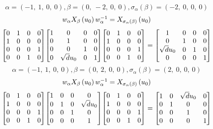 \documentclass[11pt]{article}
\theoremstyle{definition}
\begin{document}
\[
\alpha = \left( -1, \  1, \  0, \  0\right), \beta = \left( 0, \  -2, \  0, \  0\right), \sigma_{\alpha}(\beta) = \left( -2, \  0, \  0, \  0\right)
\]
\[
\scaletoalign{\textwidth}{w_{\alpha} X_{\beta}\left(u_{0}\right) w_{\alpha}^{-1} = X_{\sigma_{\alpha}\left(\beta\right)}\left(u_{0}\right)}
\]
\[
\scaletoalign{\textwidth}{{\left[\begin{matrix}0 & 1 & 0 & 0\\1 & 0 & 0 & 0\\0 & 0 & 0 & 1\\0 & 0 & 1 & 0\end{matrix}\right]} {\left[\begin{matrix}1 & 0 & 0 & 0\\0 & 1 & 0 & 0\\0 & 0 & 1 & 0\\0 & \sqrt{d} u_{0} & 0 & 1\end{matrix}\right]} {\left[\begin{matrix}0 & 1 & 0 & 0\\1 & 0 & 0 & 0\\0 & 0 & 0 & 1\\0 & 0 & 1 & 0\end{matrix}\right]} = {\left[\begin{matrix}1 & 0 & 0 & 0\\0 & 1 & 0 & 0\\\sqrt{d} u_{0} & 0 & 1 & 0\\0 & 0 & 0 & 1\end{matrix}\right]}}
\]
\[
\alpha = \left( -1, \  1, \  0, \  0\right), \beta = \left( 0, \  2, \  0, \  0\right), \sigma_{\alpha}(\beta) = \left( 2, \  0, \  0, \  0\right)
\]
\[
\scaletoalign{\textwidth}{w_{\alpha} X_{\beta}\left(u_{0}\right) w_{\alpha}^{-1} = X_{\sigma_{\alpha}\left(\beta\right)}\left(u_{0}\right)}
\]
\[
\scaletoalign{\textwidth}{{\left[\begin{matrix}0 & 1 & 0 & 0\\1 & 0 & 0 & 0\\0 & 0 & 0 & 1\\0 & 0 & 1 & 0\end{matrix}\right]} {\left[\begin{matrix}1 & 0 & 0 & 0\\0 & 1 & 0 & \sqrt{d} u_{0}\\0 & 0 & 1 & 0\\0 & 0 & 0 & 1\end{matrix}\right]} {\left[\begin{matrix}0 & 1 & 0 & 0\\1 & 0 & 0 & 0\\0 & 0 & 0 & 1\\0 & 0 & 1 & 0\end{matrix}\right]} = {\left[\begin{matrix}1 & 0 & \sqrt{d} u_{0} & 0\\0 & 1 & 0 & 0\\0 & 0 & 1 & 0\\0 & 0 & 0 & 1\end{matrix}\right]}}
\]
\end{document}
